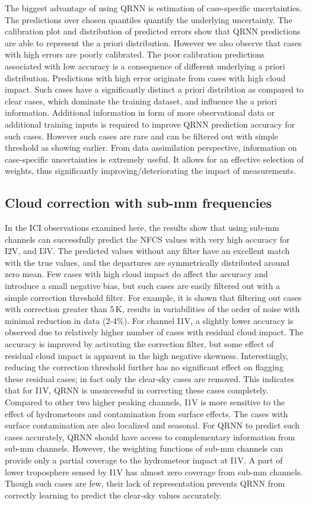 \documentclass[amt]{copernicus}
\begin{document}
The biggest advantage of using QRNN is estimation of case-specific uncertainties. The predictions over chosen quantiles quantify the underlying uncertainty. The calibration plot and distribution of predicted errors show that  QRNN predictions are able to represent the a priori distribution.  However we also observe that cases with high errors are poorly calibrated. The poor calibration predictions associated with low accuracy is a consequence of different underlying a priori distribution. Predictions with high error originate from cases with high cloud impact. Such cases have a significantly distinct a priori distribtion as compared to clear cases, which dominate the training dataset, and influence the a priori information. Additional information in form of more observational data or additional training inputs is required to improve QRNN prediction accuracy for such cases. However such cases are rare and can be filtered out with simple threshold as showing earlier.
From data assimilation perspective, information on case-specific uncertainties is extremely useful. It allows for an effective selection of weights, thus significantly improving/deteriorating the impact of measurements. 


\subsection{Cloud correction with sub-mm frequencies }
%
In the ICI observations examined here, the results show that using sub-mm channels can successfully predict the NFCS values with very high accuracy for I2V, and I3V. The predicted values without any filter have an excellent match with the true values, and the departures are symmetrically distributed around zero mean. Few cases with high cloud impact do affect the accuracy and introduce a small negative bias, but such cases are easily filtered out with a simple correction threshold filter. For example, it is shown that filtering out cases with correction greater than 5\,K, results in variabilities of the order of noise with minimal reduction in data (2-4\%). For channel I1V, a slightly lower accuracy is observed due to relatively higher number of cases with residual cloud impact. The accuracy is improved by activating the correction filter, but some effect of residual cloud impact is apparent in the high negative skewness. Interestingly, reducing the correction threshold further has no significant effect on flagging these residual cases; in fact only the clear-sky cases are removed. This indicates that for I1V, QRNN is unsuccessful in correcting these cases completely. Compared to other two higher peaking channels, I1V is more sensitive to the effect of hydrometeors  and contamination from surface effects. The cases with surface contamination are also localized and seasonal. For QRNN to predict such cases accurately, QRNN should have access to complementary information from sub-mm channels. However, the weighting functions of sub-mm channels can provide only a partial coverage to the hydrometeor impact at I1V. A part of lower troposphere sensed by I1V has almost zero coverage from sub-mm channels. Though such cases are few, their lack of representation prevents QRNN from correctly learning to predict the clear-sky values accurately.
\end{document}
